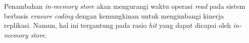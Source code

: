 \begin{enumerate}
  Penambahan \textit{in-memory store} akan mengurangi waktu operasi \textit{read} pada sistem berbasis \textit{erasure coding} dengan kemungkinan untuk mengimbangi kinerja replikasi. Namun, hal ini tergantung pada rasio \textit{hit} yang dapat dicapai oleh \textit{in-memory store}.
  


\end{enumerate}